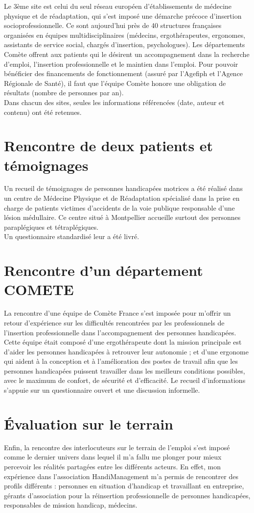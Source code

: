 Le 3ème site est celui du seul réseau européen d'établissements de médecine physique et de réadaptation, qui s'est imposé une démarche précoce d'insertion socioprofessionnelle. Ce sont aujourd'hui près de 40 structures françaises organisées en équipes multidisciplinaires (médecins, ergothérapeutes, ergonomes, assistants de service social, chargés d'insertion, psychologues). Les départements Comète offrent aux patients qui le désirent un accompagnement dans la recherche d'emploi, l'insertion professionnelle et le maintien dans l'emploi. Pour pouvoir bénéficier des financements de fonctionnement (assuré par l'Agefiph et l'Agence Régionale de Santé), il faut que l'équipe Comète honore une obligation de résultats (nombre de personnes par an).\\

Dans chacun des sites, seules les informations référencées (date, auteur et contenu) ont été retenues.

\section{Rencontre de deux patients et témoignages}
Un recueil de témoignages de personnes handicapées motrices a été réalisé dans un centre de Médecine Physique et de Réadaptation spécialisé dans la prise en charge de patients victimes d'accidents de la voie publique responsable d'une lésion médullaire. Ce centre situé à Montpellier accueille surtout des personnes paraplégiques et tétraplégiques.\\
Un questionnaire standardisé leur a été livré. 

\section{Rencontre d'un département COMETE}
La rencontre d'une équipe de Comète France s'est imposée pour m'offrir un retour d'expérience sur les difficultés rencontrées par les professionnels de l'insertion professionnelle dans l'accompagnement des personnes handicapées. 
Cette équipe était composé d'une ergothérapeute dont la mission principale est d'aider les personnes handicapées à retrouver leur autonomie ; et d'une ergonome qui aident à la conception et à l'amélioration des postes de travail afin que les personnes handicapées puissent travailler dans les meilleurs conditions possibles, avec le maximum de confort, de sécurité et d'efficacité.
Le recueil d'informations s'appuie sur un questionnaire ouvert et une discussion informelle.

\section{Évaluation sur le terrain}
Enfin, la rencontre des interlocuteurs sur le terrain de l'emploi s'est imposé comme le dernier univers dans lequel il m'a fallu me plonger pour mieux percevoir les réalités partagées entre les différents acteurs. En effet, mon expérience dans l'association HandiManagement m'a permis de rencontrer des profils différents : personnes en situation d'handicap et travaillant en entreprise, gérants d'association pour la réinsertion professionnelle de personnes handicapées, responsables de mission handicap, médecins.